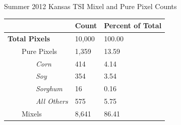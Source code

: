 %

\begin{sstable}
  \centering
  \caption{Summer 2012 Kansas TSI Mixel and Pure Pixel Counts}
  \label{table:mixels}
  \begin{tabu} to 4in {XX[r]X[r]}
    \toprule
     & Count & Percent of Total \\
    \midrule
    \textbf{Total Pixels} & 10,000 & 100.00 \\
    \ \ \ \ Pure Pixels & 1,359 & 13.59 \\
    \ \ \ \ \ \ \ \ \textit{Corn} & 414 & 4.14 \\
    \ \ \ \ \ \ \ \ \textit{Soy} & 354 & 3.54 \\
    \ \ \ \ \ \ \ \ \textit{Sorghum} & 16 & 0.16 \\
    \ \ \ \ \ \ \ \ \textit{All Others} & 575 & 5.75 \\
    \ \ \ \ Mixels & 8,641 & 86.41 \\
    \bottomrule
  \end{tabu}
\end{sstable}


